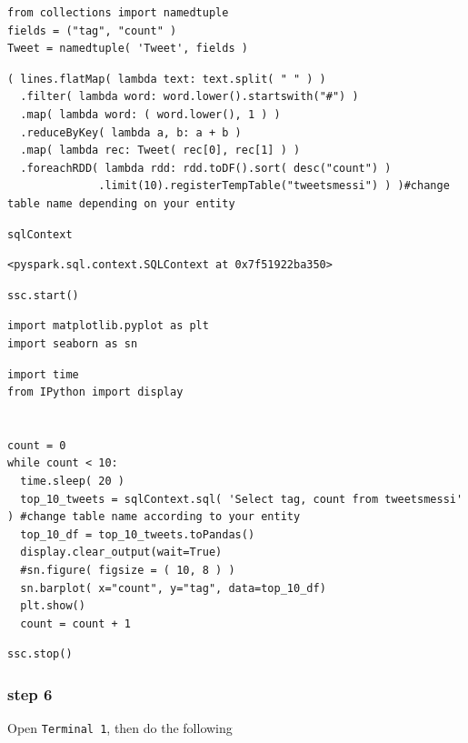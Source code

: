 \begin{lstlisting}
from collections import namedtuple
fields = ("tag", "count" )
Tweet = namedtuple( 'Tweet', fields )
\end{lstlisting}

\begin{lstlisting}
( lines.flatMap( lambda text: text.split( " " ) )
  .filter( lambda word: word.lower().startswith("#") )
  .map( lambda word: ( word.lower(), 1 ) )
  .reduceByKey( lambda a, b: a + b )
  .map( lambda rec: Tweet( rec[0], rec[1] ) )
  .foreachRDD( lambda rdd: rdd.toDF().sort( desc("count") )
              .limit(10).registerTempTable("tweetsmessi") ) )#change table name depending on your entity
\end{lstlisting}

\begin{lstlisting}
sqlContext
\end{lstlisting}

\begin{lstlisting}
<pyspark.sql.context.SQLContext at 0x7f51922ba350>
\end{lstlisting}

\begin{lstlisting}
ssc.start()  
\end{lstlisting}

\begin{lstlisting}
import matplotlib.pyplot as plt
import seaborn as sn
\end{lstlisting}

\begin{lstlisting}
import time
from IPython import display


count = 0
while count < 10:
  time.sleep( 20 )
  top_10_tweets = sqlContext.sql( 'Select tag, count from tweetsmessi' ) #change table name according to your entity 
  top_10_df = top_10_tweets.toPandas()
  display.clear_output(wait=True)  
  #sn.figure( figsize = ( 10, 8 ) )
  sn.barplot( x="count", y="tag", data=top_10_df)
  plt.show()
  count = count + 1
\end{lstlisting}

\begin{lstlisting}
ssc.stop()
\end{lstlisting}

\subsubsection{step 6}

Open \verb|Terminal 1|, then do the following

